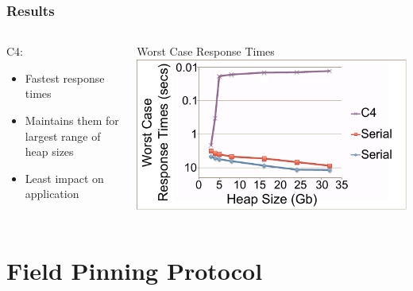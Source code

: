 \documentclass{beamer}
\begin{document}
\begin{frame}

\frametitle{Results}

\begin{columns}
\begin{column}{0.5\textwidth}


\color[RGB]{135,35,142}C4\color{black}:
\begin{itemize}
\item Fastest response times
\item Maintains them for largest range of heap sizes
\item Least impact on application
\end{itemize}

\end{column}

\begin{column}{0.5\textwidth}
\begin{center}
Worst Case Response Times
\includegraphics[width=.89\textwidth]{Illustrations/c4_results.pdf}
\end{center}
\end{column}
\end{columns}

\end{frame}



\section[FPP]{Field Pinning Protocol}
\end{document}
